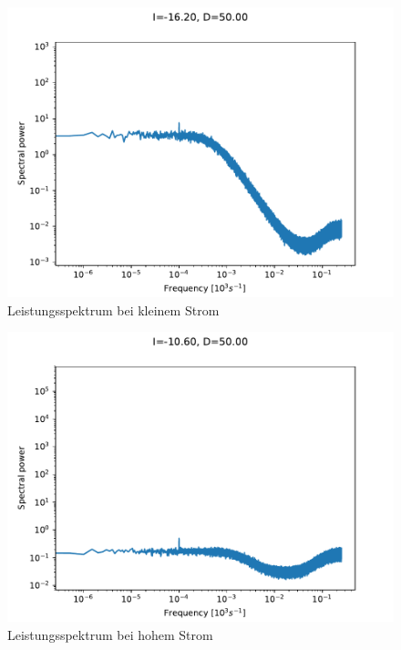 \documentclass[12pt,a4paper]{article}
\begin{document}
\begin{figure}[H]
	\centering
	\includegraphics[scale=1]{fourd5small.pdf}\caption{Leistungsspektrum bei kleinem Strom}
	\label{fourd5s}
\end{figure}
\begin{figure}[H]
\centering
\includegraphics[scale=1]{fourd5large.pdf}\caption{Leistungsspektrum bei hohem Strom}
\label{fourd5h}
\end{figure}
\end{document}
